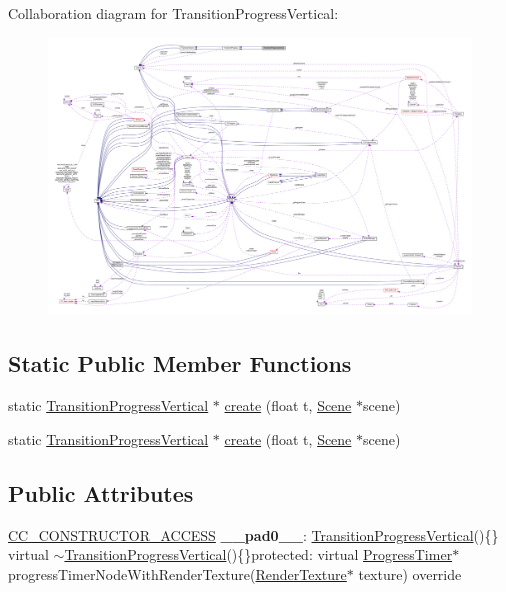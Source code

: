 Collaboration diagram for Transition\+Progress\+Vertical\+:
\nopagebreak
\begin{figure}[H]
\begin{center}
\leavevmode
\includegraphics[width=350pt]{classTransitionProgressVertical__coll__graph}
\end{center}
\end{figure}
\subsection*{Static Public Member Functions}
\begin{DoxyCompactItemize}
\item 
static \hyperlink{classTransitionProgressVertical}{Transition\+Progress\+Vertical} $\ast$ \hyperlink{classTransitionProgressVertical_a7ca7bd89258253b9f27b3eca1c183bf1}{create} (float t, \hyperlink{classScene}{Scene} $\ast$scene)
\item 
static \hyperlink{classTransitionProgressVertical}{Transition\+Progress\+Vertical} $\ast$ \hyperlink{classTransitionProgressVertical_aab123b8cfa38500defb47a29a255cd68}{create} (float t, \hyperlink{classScene}{Scene} $\ast$scene)
\end{DoxyCompactItemize}
\subsection*{Public Attributes}
\begin{DoxyCompactItemize}
\item 
\mbox{\label{classTransitionProgressVertical_ab5daf4f4cf3e2de1ee84cd30a4f1bbd5}} 
\hyperlink{_2cocos2d_2cocos_2base_2ccConfig_8h_a25ef1314f97c35a2ed3d029b0ead6da0}{C\+C\+\_\+\+C\+O\+N\+S\+T\+R\+U\+C\+T\+O\+R\+\_\+\+A\+C\+C\+E\+SS} {\bfseries \+\_\+\+\_\+pad0\+\_\+\+\_\+}\+: \hyperlink{classTransitionProgressVertical}{Transition\+Progress\+Vertical}()\{\} virtual $\sim$\hyperlink{classTransitionProgressVertical}{Transition\+Progress\+Vertical}()\{\}protected\+: virtual \hyperlink{classProgressTimer}{Progress\+Timer}$\ast$ progress\+Timer\+Node\+With\+Render\+Texture(\hyperlink{classRenderTexture}{Render\+Texture}$\ast$ texture) override
\end{DoxyCompactItemize}
